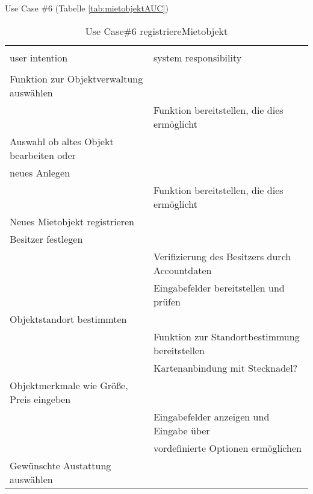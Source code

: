 \newpage
Use Case \#6 (Tabelle \ref{tab:mietobjektAUC})

\begin{table}[H]
\caption{Use Case\#6 registriereMietobjekt }
\centering
\begin{tabular}{l l}
\\ [-0.5ex]

\hline\hline
\\ [-0.5ex]
user intention & system responsibility
\\ [1.5ex]
\hline
\\ [-0.5ex]
Funktion zur Objektverwaltung auswählen      &                                   \\[1ex]
                                 & Funktion bereitstellen, die dies ermöglicht   \\[1ex]
Auswahl ob altes Objekt bearbeiten oder      &                                   \\[1ex]
neues Anlegen                          &                                   \\[1ex]
                                 & Funktion bereitstellen, die dies ermöglicht   \\[1ex]
Neues Mietobjekt registrieren          &                                   \\[1ex] 
Besitzer festlegen                     &                                   \\[1ex] 
                                 & Verifizierung des Besitzers durch Accountdaten \\[1ex]
                                 & Eingabefelder bereitstellen und prüfen     \\[1ex]
Objektstandort bestimmten              &                                   \\[1ex]
                                 & Funktion zur Standortbestimmung bereitstellen  \\[1ex] 
                                 & Kartenanbindung mit Stecknadel?              \\[1ex]   
Objektmerkmale wie Größe, Preis eingeben  &                                   \\[1ex]
                                 & Eingabefelder anzeigen und Eingabe über       \\[1ex]
                                 & vordefinierte Optionen ermöglichen         \\[1ex]
Gewünschte Austattung auswählen           &                                   \\[1ex]

\end{tabular}
\end{table}
